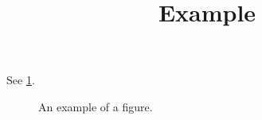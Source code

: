 \documentclass{amsart}
\begin{document}
\title{Example}
\author{}
\date{}
\maketitle
See \cref{fig:example}.
\begin{figure}
\begin{overlay}
\end{overlay}
\caption{An example of a figure.}
\label{fig:example}
\end{figure}
\end{document}
